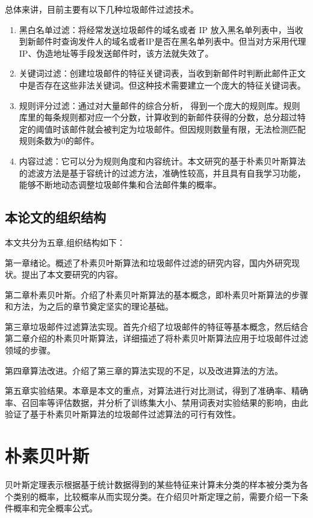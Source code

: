 \documentclass[UTF8,zihao=-4]{ctexart}
\begin{document}
总体来讲，目前主要有以下几种垃圾邮件过滤技术。
\renewcommand\labelenumi{(\theenumi)}
\begin{enumerate}
	\item 黑白名单过滤：将经常发送垃圾邮件的域名或者 IP 放入黑名单列表中，当收到新邮件时查询发件人的域名或者IP是否在黑名单列表中。但当对方采用代理IP、伪造地址等手段发送邮件时，该方法就失效了。
	\item 关键词过滤：创建垃圾邮件的特征关键词表，当收到新邮件时判断此邮件正文中是否存在这些非法关键词。但这种技术需要建立一个庞大的特征关键词表。
	\item 规则评分过滤：通过对大量邮件的综合分析， 得到一个庞大的规则库。规则库里的每条规则都对应一个分数，计算收到的新邮件获得的分数，总分超过特定的阈值时该邮件就会被判定为垃圾邮件。但因规则数量有限，无法检测匹配规则条数为0的邮件。
	\item 内容过滤：它可以分为规则角度和内容统计。本文研究的基于朴素贝叶斯算法的滤波方法是基于容统计的过滤方法，准确性较高，并且具有自我学习功能，能够不断地动态调整垃圾邮件集和合法邮件集的概率。
\end{enumerate}

\subsection{本论文的组织结构}
	本文共分为五章,组织结构如下：
	
	第一章绪论。概述了朴素贝叶斯算法和垃圾邮件过滤的研究内容，国内外研究现状。提出了本文要研究的内容。
	
	第二章朴素贝叶斯。介绍了朴素贝叶斯算法的基本概念，即朴素贝叶斯算法的步骤和方法，为之后的章节奠定坚实的理论基础。
	
	第三章垃圾邮件过滤算法实现。首先介绍了垃圾邮件的特征等基本概念，然后结合第二章介绍的朴素贝叶斯算法，详细描述了将朴素贝叶斯算法应用于垃圾邮件过滤领域的步骤。
	
	第四章算法改进。介绍了第三章的算法实现的不足，以及改进算法的方法。
	
	第五章实验结果。本章是本文的重点，对算法进行对比测试，得到了准确率、精确率、召回率等评估数据，并分析了训练集大小、禁用词表对实验结果的影响，由此验证了基于朴素贝叶斯算法的垃圾邮件过滤算法的可行有效性。

\section{朴素贝叶斯}
	贝叶斯定理表示根据基于统计数据得到的某些特征来计算未分类的样本被分类为各个类别的概率，比较概率从而实现分类。在介绍贝叶斯定理之前，需要介绍一下条件概率和完全概率公式。
	
\end{document}
